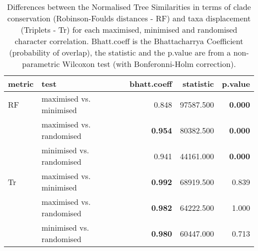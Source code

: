 \begin{table}[ht]
\centering
\begin{tabular}{llr|rr}
  \hline
metric & test & bhatt.coeff & statistic & p.value \\ 
  \hline
RF & maximised vs. minimised & 0.848 & 97587.500 & \textbf{0.000} \\ 
   & maximised vs. randomised & \textbf{0.954} & 80382.500 & \textbf{0.000} \\ 
   & minimised vs. randomised & 0.941 & 44161.000 & \textbf{0.000} \\ 
  Tr & maximised vs. minimised & \textbf{0.992} & 68919.500 & 0.839 \\ 
   & maximised vs. randomised & \textbf{0.982} & 64222.500 & 1.000 \\ 
   & minimised vs. randomised & \textbf{0.980} & 60447.000 & 0.713 \\ 
   \hline
\end{tabular}
\caption{Differences between the Normalised Tree Similarities in terms of clade conservation (Robinson-Foulds distances - RF) and taxa displacement (Triplets - Tr) for each maximised, minimised and randomised character correlation. Bhatt.coeff is the Bhattacharrya Coefficient (probability of overlap), the statistic and the p.value are from a non-parametric Wilcoxon test (with Bonferonni-Holm correction).} 
\label{Tab_pooledscenarios_test}
\end{table}
